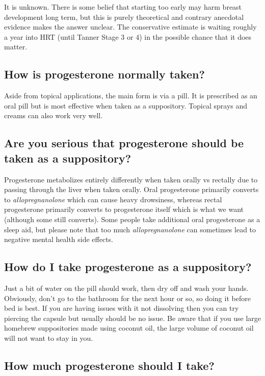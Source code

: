\documentclass{article}
\begin{document}
It is unknown. There is some belief that starting too early may harm breast development long term, but this is purely theoretical and contrary anecdotal evidence makes the answer unclear. The conservative estimate is waiting roughly a year into HRT (until Tanner Stage 3 or 4) in the possible chance that it does matter.

\subsection{How is progesterone normally taken?}

Aside from topical applications, the main form is via a pill. It is prescribed as an oral pill but is most effective when taken as a suppository. Topical sprays and creams can also work very well.

\subsection{Are you serious that progesterone should be taken as a suppository?}

Progesterone metabolizes entirely differently when taken orally vs rectally due to passing through the liver when taken orally. Oral progesterone primarily converts to \textit{allopregnanolone} which can cause heavy drowsiness, whereas rectal progesterone primarily converts to progesterone itself which is what we want (although some still converts). Some people take additional oral progesterone as a sleep aid, but please note that too much \textit{allopregnanolone }can sometimes lead to negative mental health side effects.

\subsection{How do I take progesterone as a suppository?}

Just a bit of water on the pill should work, then dry off and wash your hands. Obviously, don’t go to the bathroom for the next hour or so, so doing it before bed is best. If you are having issues with it not dissolving then you can try piercing the capsule but usually should be no issue. Be aware that if you use large homebrew suppositories made using coconut oil, the large volume of coconut oil will not want to stay in you.

\subsection{How much progesterone should I take?}
\end{document}
